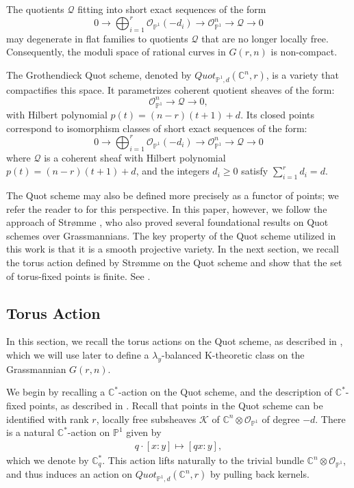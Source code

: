 \documentclass{amsart}
\begin{document}
The quotients $\mathcal{Q}$ fitting into short exact sequences of the form 
\[
0 \to \bigoplus_{i=1}^r \mathcal{O}_{\mathbb{P}^1}(-d_i) \to \mathcal{O}^n_{\mathbb{P}^1} \to \mathcal{Q} \to 0 
\]
may degenerate in flat families to quotients $\mathcal{Q}$ that are no longer locally free. Consequently, the moduli space of rational curves in $G(r,n)$ is non-compact.

The Grothendieck Quot scheme, denoted by $Quot_{\mathbb{P}^1,d}(\mathbb{C}^n,r)$, is a variety that compactifies this space. It parametrizes coherent quotient sheaves of the form: 
\[
\mathcal{O}_{\mathbb{P}^1}^n \to \mathcal{Q} \to 0,
\]
with Hilbert polynomial $p(t) = (n-r)(t+1)+d$. Its
closed points correspond to isomorphism classes of short exact sequences of the form:
\[
0 \to \bigoplus_{i=1}^r \mathcal{O}_{\mathbb{P}^1}(-d_i) \to \mathcal{O}^n_{\mathbb{P}^1} \to \mathcal{Q} \to 0
\]
where $\mathcal{Q}$ is a coherent sheaf with Hilbert polynomial $p(t) = (n-r)(t+1)+d$, and the integers $d_i \geq 0$ satisfy $\sum_{i=1}^r d_i = d$.
 

The Quot scheme may also be defined more precisely as a functor of points; we refer the reader to \cite{GRo} for this perspective. In this paper, however, we follow the approach of Strømme \cite{MR908717}, who also proved several foundational results on Quot schemes over Grassmannians. The key property of the Quot scheme utilized in this work is that it is a smooth projective variety. In the next section, we recall the torus action defined by Strømme on the Quot scheme and show that the set of torus-fixed points is finite. See \cite[Theorem 2.1]{MR908717}.

\subsection{Torus Action}\label{Torussection} In this section, we recall the torus actions on the Quot scheme, as described in \cite{Bertram:2003qd, MR908717}, which we will use later to define a $\lambda_y$-balanced K-theoretic class on the Grassmannian $G(r,n)$.

We begin by recalling a $\mathbb{C}^*$-action on the Quot scheme, and the description of $\mathbb{C}^*$-fixed points, as described in \cite{Bertram:2003qd}. 
Recall that points in the Quot scheme can be identified with rank $r$, locally free subsheaves $\mathcal{K}$ of $\mathbb{C}^n \otimes \mathcal{O}_{\mathbb{P}^1}$ of degree $-d$.
There is a natural $\mathbb{C}^*$-action on $\mathbb{P}^1$ given by
\begin{align} \label{action}
    q\cdot[x:y] \longmapsto [q x:y],
\end{align}
which we denote by $\mathbb{C}_q^*$. This action lifts naturally to the trivial bundle $\mathbb{C}^n \otimes \mathcal{O}_{\mathbb{P}^1}$, and thus induces an action on $Quot_{\mathbb{P}^1,d}(\mathbb{C}^n,r)$ by pulling back kernels.
\end{document}
